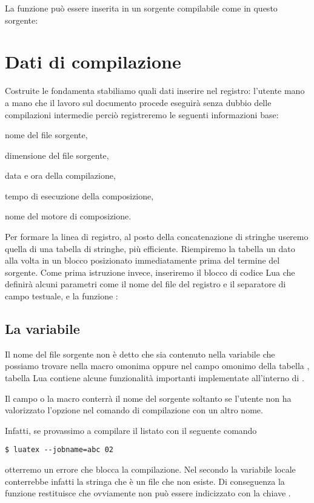 La funzione  può essere inserita in un sorgente \LuaTeX{}
compilabile come in questo sorgente:


\section{Dati di compilazione}

Costruite le fondamenta stabiliamo quali dati inserire nel registro: l'utente 
mano a mano che il lavoro sul documento procede eseguirà senza dubbio delle
compilazioni intermedie perciò registreremo le seguenti informazioni base:
\begin{compactenumerate}
\item nome del file sorgente,
\item dimensione del file sorgente,
\item data e ora della compilazione,
\item tempo di esecuzione della composizione,
\item nome del motore di composizione.
\end{compactenumerate}

Per formare la linea di registro, al posto della concatenazione di stringhe
useremo quella di una tabella di stringhe, più efficiente. Riempiremo la tabella
un dato alla volta in un blocco  posizionato immediatamente prima
del termine del sorgente. Come prima istruzione invece, inseriremo il blocco di
codice Lua che definirà alcuni parametri come il nome del file del registro e il
separatore di campo testuale, e la funzione :


\subsection{La variabile }

Il nome del file sorgente non è detto che sia contenuto nella variabile
 che possiamo trovare nella macro omonima oppure nel campo omonimo
della tabella , tabella Lua contiene alcune funzionalità importanti
implementate all'interno di \LuaTeX.

Il campo o la macro conterrà il nome del sorgente soltanto se l'utente non ha
valorizzato l'opzione  nel comando di compilazione con un altro
nome.

Infatti, se provassimo a compilare il listato  con il seguente
comando
\begin{Verbatim}
$ luatex --jobname=abc 02
\end{Verbatim}
otterremo un errore che blocca la compilazione. Nel secondo  la
variabile locale  conterrebbe infatti la stringa 
che è un file che non esiste. Di conseguenza la funzione 
restituisce  che ovviamente non può essere indicizzato con la chiave
.

